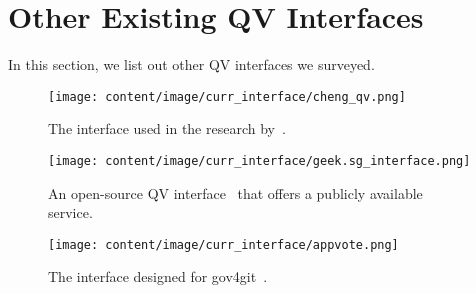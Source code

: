 \newpage
\section{Other Existing QV Interfaces}
\label{apdx:otherQV}
In this section, we list out other QV interfaces we surveyed.


\begin{figure}[h!]
    \centering
    \texttt{[image: content/image/curr\_interface/cheng\_qv.png]}
    \caption{The interface used in the research by~\textcite{chengCanShowWhat2021}.}
    \label{fig:raymondQV}
\end{figure}

\begin{figure}[h!]
    \centering
    \texttt{[image: content/image/curr\_interface/geek.sg\_interface.png]}
    \caption{An open-source QV interface~\cite{yehjxraymondYehjxraymondQvapp2024} that offers a publicly available service.}
    \label{fig:raymondQV}
\end{figure}

\begin{figure}[h!]
    \centering
    \texttt{[image: content/image/curr\_interface/appvote.png]}
    \caption{The interface designed for gov4git~\cite{Gov4gitDecentralizedPlatform2023}.}
    \label{fig:gov4gitQV}
\end{figure}

\newpage
